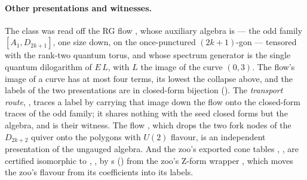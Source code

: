\documentclass[11pt]{amsart}
\theoremstyle{remark}
\begin{document}
\begin{sloppypar}
\paragraph{Other presentations and witnesses.}  The class was read off the RG
flow , whose auxiliary algebra is
 --- the odd family $[A_1,D_{2k+1}]$, one size
down, on the once-punctured $(2k+1)$-gon --- tensored with the rank-two
quantum torus, and whose spectrum generator is the single quantum
dilogarithm of $E\,L$, with $L$ the image of the curve $(0,3)$.  The flow's
image of a curve has at most four terms, its lowest the collapse above,
and the labels of the two presentations are in closed-form bijection
().  The \emph{transport route},
, traces a label by
carrying that image down the flow onto the closed-form traces of the odd
family; it shares nothing with the seed closed forms but the algebra, and is
their witness.  The flow , which drops the two fork
nodes of the $D_{2k+2}$ quiver onto the polygons  with
$U(2)$ flavour, is an independent presentation of the ungauged algebra.  And
the zoo's exported cone tables , ,  are
certified isomorphic to , ,
 by s
() from the zoo's Z-form
wrapper , which moves the zoo's flavour from its
coefficients into its labels.
\end{sloppypar}
\end{document}
